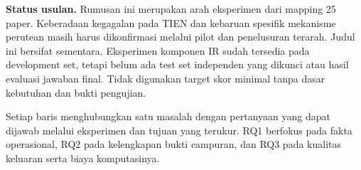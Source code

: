 \documentclass[11pt,a4paper]{article}
\newcommand{\heading}[1]{\vspace{5pt}{\large\bfseries #1}\par\vspace{1pt}}
\begin{document}
\textbf{Status usulan.} Rumusan ini merupakan arah eksperimen dari mapping 25 paper. Keberadaan kegagalan pada TIEN dan kebaruan spesifik mekanisme perutean masih harus dikonfirmasi melalui pilot dan penelusuran terarah. Judul ini bersifat sementara. Eksperimen komponen IR sudah tersedia pada development set, tetapi belum ada test set independen yang dikunci atau hasil evaluasi jawaban final. Tidak digunakan target skor minimal tanpa dasar kebutuhan dan bukti pengujian.

\clearpage
\begin{landscape}
\heading{Matriks Research Problems Research Questions dan Research Objectives}
Setiap baris menghubungkan satu masalah dengan pertanyaan yang dapat dijawab melalui eksperimen dan tujuan yang terukur. RQ1 berfokus pada fakta operasional, RQ2 pada kelengkapan bukti campuran, dan RQ3 pada kualitas keluaran serta biaya komputasinya.


\end{landscape}
\end{document}
